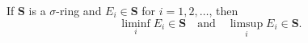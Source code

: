 If $\mathbf{S}$ is a $\sigma$-ring and $E_i \in \mathbf{S}$ for $i = 1, 2, \dots$, then
$$\liminf_i E_i \in \mathbf{S} \quad \text{and} \quad \limsup_i E_i \in \mathbf{S}.$$
